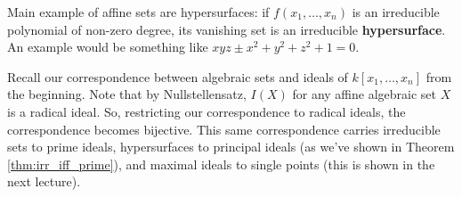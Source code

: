\documentclass[12pt]{article}
\newcommand{\C}{\mathbb{C}}
\begin{document}
    Main example of affine sets are hypersurfaces: if $f(x_1, \dots, x_n)$ is an irreducible polynomial of non-zero degree, its vanishing set is an irreducible \textbf{hypersurface}. An example would be something like $xyz \pm x^2 + y^2 + z^2 + 1 = 0$. \par
    Recall our correspondence between algebraic sets and ideals of $k[x_1, \dots, x_n]$ from the beginning. Note that by Nullstellensatz, $I(X)$ for any affine algebraic set $X$ is a radical ideal. So, restricting our correspondence to radical ideals, the correspondence becomes bijective. This same correspondence carries irreducible sets to prime ideals, hypersurfaces to principal ideals (as we've shown in Theorem \ref{thm:irr_iff_prime}), and maximal ideals to single points (this is shown in the next lecture). \par
\end{document}
